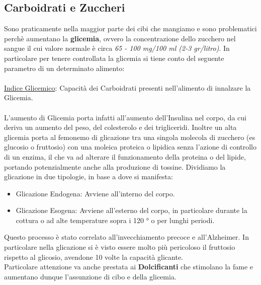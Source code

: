 \documentclass[../uefaC.tex]{subfiles}
\begin{document}
\subsection{Carboidrati e Zuccheri}
Sono praticamente nella maggior parte dei cibi che mangiamo e sono problematici perchè aumentano la \textbf{glicemia}, ovvero la concentrazione dello zucchero nel sangue il cui valore normale è circa \emph{65 - 100 mg/100 ml (2-3 gr/litro)}. In particolare per tenere controllata la glicemia si tiene conto del seguente parametro di un determinato alimento: \hfill \\
\hfill \\
\underline{Indice Glicemico}: Capacità dei Carboidrati presenti nell'alimento di innalzare la Glicemia.
\hfill \\
\hfill \\
L'aumento di Glicemia porta infatti all'aumento dell'Insulina nel corpo, da cui deriva un aumento del peso, del colesterolo e dei trigliceridi. Inoltre un alta glicemia porta al femonemo di glicazione tra una singola molecola di zucchero (es glucosio o fruttosio) con una moleica proteica o lipidica senza l'azione di controllo di un enzima, il che va ad alterare il funzionamento della proteina o del lipide, portando potenzialmente anche alla produzione di tossine. Dividiamo la glicazione in due tipologie, in base a dove si manifesta:
\begin{itemize}
    \item Glicazione Endogena: Avviene all'interno del corpo.
    \item Glicazione Esogena: Avviene all'esterno del corpo, in particolare durante la cottura o ad alte temperature sopra i 120 ° o per lunghi periodi.
\end{itemize}
Questo processo è stato correlato all'invecchiamento precoce e all'Alzheimer. In particolare nella glicazione si è visto essere molto più pericoloso il fruttosio rispetto al glicosio, avendone 10 volte la capacità glicante. \hfill \\
Particolare attenzione va anche prestata ai \textbf{Dolcificanti} che stimolano la fame e aumentano dunque l'assunzione di cibo e della glicemia.
\end{document}
